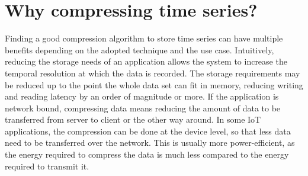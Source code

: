 \section{Why compressing time series?}
Finding a good compression algorithm to store time series can have multiple benefits depending
on the adopted technique and the use case.
Intuitively, reducing the storage needs of an application allows the system to increase the 
temporal resolution at which the data is recorded.
The storage requirements may be reduced up to the point the whole data set can fit in memory,
reducing writing and reading latency by an order of magnitude or more.
If the application is network bound, compressing data means reducing the amount of data to be
transferred from server to client or the other way around.
In some IoT applications, the compression can be done at the device level, so that less data
need to be transferred over the network. This is usually more power-efficient, as the energy
required to compress the data is much less compared to the energy required to transmit it.

